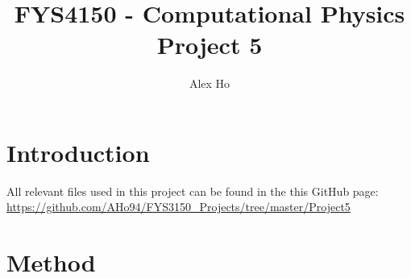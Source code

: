 \documentclass[12pt]{article}
\author{Alex Ho}
\title{FYS4150 - Computational Physics \\ Project 5}
\begin{document}
\maketitle
\begin{abstract}
\end{abstract}
\newpage
\tableofcontents
\newpage
\section{Introduction} \label{section:intro}

All relevant files used in this project can be found in the this GitHub page:
\url{https://github.com/AHo94/FYS3150_Projects/tree/master/Project5}
\section{Method} \label{section:method}
\end{document}
